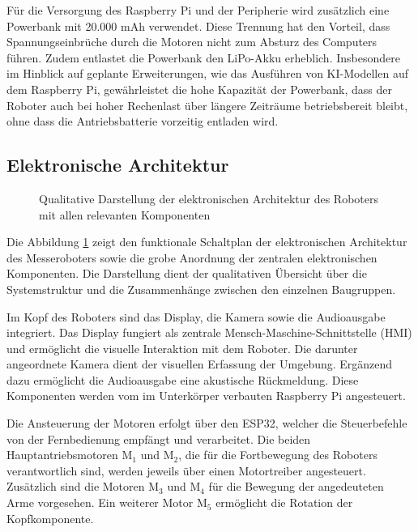 Für die Versorgung des Raspberry Pi und der Peripherie wird zusätzlich eine Powerbank mit 20.000 mAh verwendet. Diese Trennung hat den Vorteil, dass Spannungseinbrüche durch die Motoren nicht zum Absturz des Computers führen. Zudem entlastet die Powerbank den LiPo-Akku erheblich. Insbesondere im Hinblick auf geplante Erweiterungen, wie das Ausführen von KI-Modellen auf dem Raspberry Pi, gewährleistet die hohe Kapazität der Powerbank, dass der Roboter auch bei hoher Rechenlast über längere Zeiträume betriebsbereit bleibt, ohne dass die Antriebsbatterie vorzeitig entladen wird.

\subsection{Elektronische Architektur}
\label{cha:Elektronische Architektur}

\vspace{0.5cm}
\begin{figure}[H]
	\centering
		
	\vspace{1cm}
	\caption{Qualitative Darstellung der elektronischen Architektur des Roboters mit allen relevanten Komponenten}		
	\label{fig:Konstruktions_Plan}
\end{figure}

Die Abbildung \ref{fig:Konstruktions_Plan} zeigt den funktionale Schaltplan der elektronischen Architektur des Messeroboters sowie die grobe Anordnung der zentralen elektronischen Komponenten. Die Darstellung dient der qualitativen Übersicht über die Systemstruktur und die Zusammenhänge zwischen den einzelnen Baugruppen.

Im Kopf des Roboters sind das Display, die Kamera sowie die Audioausgabe integriert. Das Display fungiert als zentrale Mensch-Maschine-Schnittstelle (HMI) und ermöglicht die visuelle Interaktion mit dem Roboter. Die darunter angeordnete Kamera dient der visuellen Erfassung der Umgebung. Ergänzend dazu ermöglicht die Audioausgabe eine akustische Rückmeldung. Diese Komponenten werden vom im Unterkörper verbauten Raspberry Pi angesteuert.

Die Ansteuerung der Motoren erfolgt über den ESP32, welcher die Steuerbefehle von der Fernbedienung empfängt und verarbeitet. Die beiden Hauptantriebsmotoren M$_1$ und M$_2$, die für die Fortbewegung des Roboters verantwortlich sind, werden jeweils über einen Motortreiber angesteuert. Zusätzlich sind die Motoren M$_3$ und M$_4$ für die Bewegung der angedeuteten Arme vorgesehen. Ein weiterer Motor M$_5$ ermöglicht die Rotation der Kopfkomponente.

